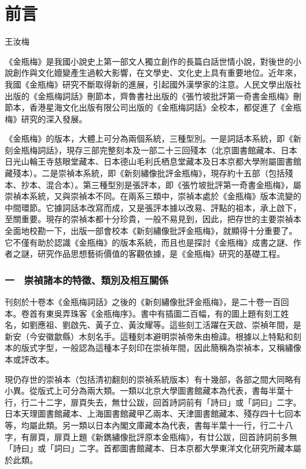 \chapter*{前言}

\begin{declareqianyan}
王汝梅\qquad\ 
\end{declareqianyan}	

《金瓶梅》是我國小說史上第一部文人獨立創作的長篇白話世情小說，對後世的小說創作與文化嬗變產生過較大影響，在文學史、文化史上具有重要地位。近年來，我國《金瓶梅》研究不斷取得新的進展，引起國外漢學家的注意。人民文學出版社出版的《金瓶梅詞話》刪節本，齊魯書社出版的《張竹坡批評第一奇書金瓶梅》刪節本，香港星海文化出版有限公司出版的《金瓶梅詞話》全校本，都促進了《金瓶梅》研究的深入發展。

《金瓶梅》的版本，大體上可分為兩個系統，三種型別。一是詞話本系統，即《新刻金瓶梅詞話》，現存三部完整刻本及一部二十三回殘本（北京圖書館藏本、日本日光山輪王寺慈眼堂藏本、日本德山毛利氏栖息堂藏本及日本京都大學附屬圖書館藏殘本）。二是崇禎本系統，即《新刻繡像批評金瓶梅》，現存約十五部（包括殘本、抄本、混合本）。第三種型別是張評本，即《張竹坡批評第一奇書金瓶梅》，屬崇禎本系統，又與崇禎本不同。在兩系三類中，崇禎本處於《金瓶梅》版本流變的中間環節。它據詞話本改寫而成，又是張評本據以改易、評點的祖本，承上啟下，至關重要。現存的崇禎本都十分珍貴，一般不易見到，因此，把存世的主要崇禎本全面地校勘一下，出版一部會校本《新刻繡像批評金瓶梅》，就顯得十分重要了。它不僅有助於認識《金瓶梅》的版本系統，而且也是探討《金瓶梅》成書之謎、作者之謎，研究作品思想藝術價值的客觀依據，是《金瓶梅》研究的基礎工程。

\subsection*{一　崇禎諸本的特徵、類別及相互關係}

刊刻於十卷本《金瓶梅詞話》之後的《新刻繡像批評金瓶梅》，是二十卷一百回本。卷首有東吳弄珠客《金瓶梅序》。書中有插圖二百幅，有的圖上題有刻工姓名，如劉應祖、劉啟先、黃子立、黃汝耀等。這些刻工活躍在天啟、崇禎年間，是新安（今安徽歙縣）木刻名手。這種刻本避明崇禎帝朱由檢諱。根據以上特點和刻本的版式字型，一般認為這種本子刻印在崇禎年間，因此簡稱為崇禎本，又稱繡像本或評改本。

現仍存世的崇禎本（包括清初翻刻的崇禎系統版本）有十幾部，各部之間大同略有小異。從版式上可分為兩大類。一類以北京大學圖書館藏本為代表，書每半葉十行，行二十二字，扉頁失去，無廿公跋，回首詩詞前有「詩曰」或「詞曰」二字。日本天理圖書館藏本、上海圖書館藏甲乙兩本、天津圖書館藏本、殘存四十七回本等，均屬此類。另一類以日本內閣文庫藏本為代表，書每半葉十一行，行二十八字，有扉頁，扉頁上題《新鐫繡像批評原本金瓶梅》，有廿公跋，回首詩詞前多無 「詩曰」或「詞曰」二字。首都圖書館藏本、日本京都大學東洋文化研究所藏本屬於此類。

